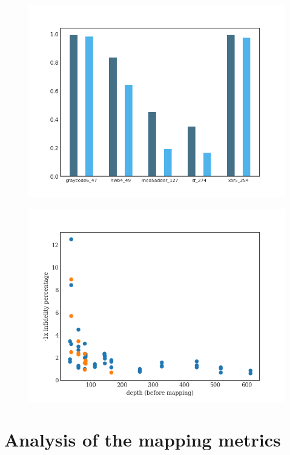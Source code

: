 \label{tab:map_selected_benchs}
\begin{figure}[htbp]
\centering
\includegraphics[width=\textwidth]{figures/f_diff_bar_plot.png}
\caption{\label{fig:orgbd5cc35}
}
\end{figure}
\begin{figure}[htbp]
\centering
\includegraphics[width=\textwidth]{figures/infid_percentage_depth_before_mapping.png}
\caption{\label{fig:org01d5b3f}
}
\end{figure}

\section*{Analysis of the mapping metrics}
\label{sec:orgfea681e}


